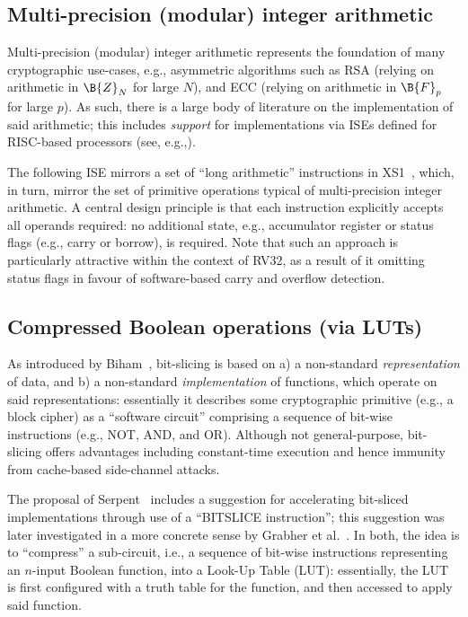 
\subsection{Multi-precision (modular) integer arithmetic}

Multi-precision (modular) integer arithmetic represents the foundation
of many cryptographic use-cases, e.g., asymmetric algorithms such as
RSA (relying on arithmetic in $\B{Z}_N$ for large $N$),
and
ECC (relying on arithmetic in $\B{F}_p$ for large $p$).
As such, there is a large body of literature on the implementation of
said arithmetic; this includes {\em support} for implementations via
ISEs defined for RISC-based processors
(see, e.g.,\cite{SCARV:GroKam:03,SCARV:GroKam:04}).

The following ISE mirrors a set of ``long arithmetic'' instructions in
XS1~\cite[Section 18]{SCARV:XS1:09}, which, in turn, mirror the set of
primitive operations typical of multi-precision integer arithmetic.  
A central design principle is that each instruction explicitly accepts 
all operands required: no additional state, e.g., accumulator register
or status flags (e.g., carry or borrow), is required.  Note that such
an approach is particularly attractive within the context of RV32, as
a result of it omitting status flags in favour of software-based carry
and overflow detection.

\subsection{Compressed Boolean operations (via LUTs)}

As introduced by Biham~\cite{SCARV:Biham:97}, bit-slicing is based on
a) a non-standard {\em representation} of data,
   and
b) a non-standard {\em implementation} of functions, which operate on
   said representations:
essentially it describes some cryptographic primitive (e.g., a block
cipher) as a  ``software circuit'' comprising a sequence of bit-wise 
instructions (e.g., NOT, AND, and OR).  Although not general-purpose,
bit-slicing offers advantages including constant-time execution and 
hence immunity from cache-based side-channel attacks.

The proposal of Serpent~\cite[Page 232]{SCARV:BihAndKnu:98} includes 
a suggestion for accelerating bit-sliced implementations through use 
of a ``BITSLICE instruction''; this suggestion was later investigated 
in a more concrete sense by Grabher et al.~\cite{SCARV:GraGroPag:08}.
In both, the idea is to ``compress'' a sub-circuit, i.e., a sequence 
of bit-wise instructions representing an $n$-input Boolean function,
into a Look-Up Table (LUT): essentially, the LUT is first configured 
with a truth table for the function, and then accessed to apply said
function.  

